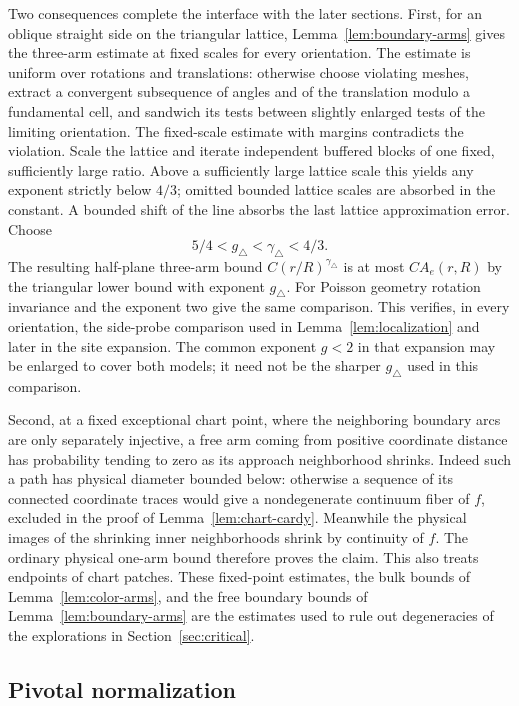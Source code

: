 Two consequences complete the interface with the later sections.
First, for an oblique straight side on the triangular lattice,
Lemma~\ref{lem:boundary-arms} gives the three-arm estimate at
fixed scales for every orientation.  The estimate is uniform
over rotations and translations: otherwise choose violating
meshes, extract a convergent subsequence of angles and of the
translation modulo a fundamental cell, and sandwich its tests
between slightly enlarged tests of the limiting orientation.
The fixed-scale estimate with margins contradicts the violation.
Scale the
lattice and iterate independent buffered blocks of one fixed,
sufficiently large ratio.  Above a sufficiently large lattice
scale this yields any exponent strictly below $4/3$; omitted
bounded lattice scales are absorbed in the constant.  A bounded
shift of the line absorbs the last lattice approximation error.
Choose
\[
 5/4<g_\triangle<\gamma_\triangle<4/3.
\]
The resulting half-plane three-arm bound
$C(r/R)^{\gamma_\triangle}$ is at most $C A_e(r,R)$ by the
triangular lower bound with exponent $g_\triangle$.
For Poisson geometry rotation invariance and the exponent two
give the same comparison.  This verifies, in every orientation,
the side-probe comparison used in Lemma~\ref{lem:localization}
and later in the site expansion.  The common exponent $g<2$
in that expansion may be enlarged to cover both models; it
need not be the sharper $g_\triangle$ used in this comparison.

Second, at a fixed exceptional chart point, where the neighboring
boundary arcs are only separately injective, a free arm coming
from positive coordinate distance has probability tending to
zero as its approach neighborhood shrinks.  Indeed such a path
has physical diameter bounded below: otherwise a sequence of
its connected coordinate traces would give a nondegenerate
continuum fiber of $f$, excluded in the proof of
Lemma~\ref{lem:chart-cardy}.  Meanwhile the physical images of
the shrinking inner neighborhoods shrink by continuity of $f$.
The ordinary physical one-arm bound therefore proves the
claim.  This also treats endpoints of chart patches.  These
fixed-point estimates, the bulk bounds of
Lemma~\ref{lem:color-arms}, and the free boundary bounds of
Lemma~\ref{lem:boundary-arms} are the estimates used to rule
out degeneracies of the explorations in Section~\ref{sec:critical}.

\subsection{Pivotal normalization}

